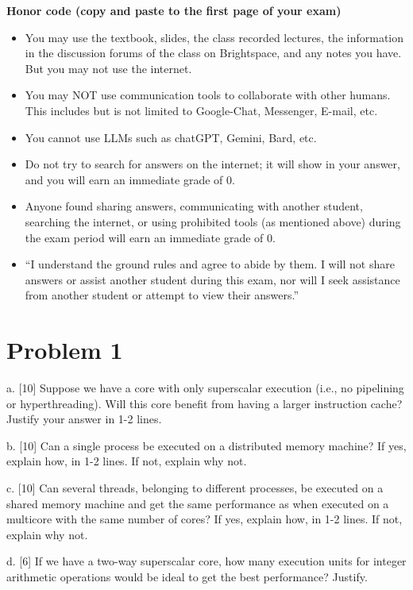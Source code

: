 \documentclass{article}
\begin{document}
\textbf{Honor code (copy and paste to the first page of your exam)}

\begin{itemize}
    \item You may use the textbook, slides, the class recorded lectures, the information in the discussion forums of the class on Brightspace, and any notes you have. But you may not use the internet.
    \item You may NOT use communication tools to collaborate with other humans. This includes but is not limited to Google-Chat, Messenger, E-mail, etc.
    \item You cannot use LLMs such as chatGPT, Gemini, Bard, etc.
    \item Do not try to search for answers on the internet; it will show in your answer, and you will earn an immediate grade of 0.
    \item Anyone found sharing answers, communicating with another student, searching the internet, or using prohibited tools (as mentioned above) during the exam period will earn an immediate grade of 0.
    \item “I understand the ground rules and agree to abide by them. I will not share answers or assist another student during this exam, nor will I seek assistance from another student or attempt to view their answers.”
\end{itemize}

\section*{Problem 1}

a. [10]  Suppose we have a core with only superscalar execution (i.e., no pipelining or hyperthreading). Will this core benefit from having a larger instruction cache? Justify your answer in 1-2 lines.

b. [10] Can a single process be executed on a distributed memory machine? If yes, explain how, in 1-2 lines. If not, explain why not.

c. [10] Can several threads, belonging to different processes, be executed on a shared memory machine and get the same performance as when executed on a multicore with the same number of cores? If yes, explain how, in 1-2 lines. If not, explain why not.

d. [6] If we have a two-way superscalar core, how many execution units for integer arithmetic operations would be ideal to get the best performance? Justify.
\end{document}
